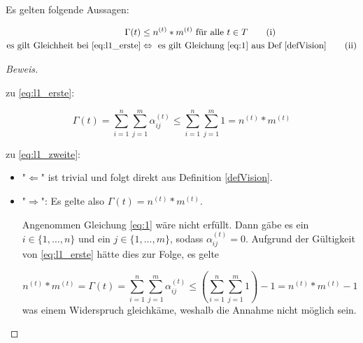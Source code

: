 \vspace{0.3cm}

\begin{Lemma}

Es gelten folgende Aussagen:


\begin{align}
\Gamma(t) &\leq n^{(t)} * m^{(t)} \textrm{ für alle } t \in T \tag{i} \label{eq:l1_erste} \\ 
  \text{es gilt Gleichheit bei }  \eqref{eq:l1_erste} &\Leftrightarrow \text{ es gilt Gleichung } \eqref{eq:1} \text{ aus Def } \ref{defVision} \tag{ii} \label{eq:l1_zweite}
\end{align}



\end{Lemma}

\vspace{0.3cm}

\begin{proof}[Beweis] \textrm{ }

\vspace{0.3cm}

  zu \eqref{eq:l1_erste}: 
  
\begin{equation*}
  \Gamma(t) = \sum_{i=1}^n \sum_{j=1}^m \alpha^{(t)}_{ij} \leq \sum_{i=1}^n \sum_{j=1}^m 1 = n^{(t)} * m^{(t)}
\end{equation*}

\vspace{0.3cm} 

zu \eqref{eq:l1_zweite}: 

\begin{itemize}
  \item "$\Leftarrow$" ist trivial und folgt direkt aus Definition \ref{defVision}.
  \item "$\Rightarrow$": Es gelte also $\Gamma(t) = n^{(t)} * m^{(t)}$.
  
  Angenommen Gleichung \eqref{eq:1} wäre nicht erfüllt. Dann gäbe es ein $i \in \{1,...,n\}$ und ein $j \in \{1,...,m\}$, sodass $\alpha^{(t)}_{ij} = 0$. Aufgrund der Gültigkeit von \eqref{eq:l1_erste} hätte dies zur Folge, es gelte
  
\begin{equation*}
  n^{(t)} * m^{(t)} = \Gamma(t) = \sum_{i=1}^n \sum_{j=1}^m \alpha^{(t)}_{ij} \leq (\sum_{i=1}^n \sum_{j=1}^m 1) - 1 = n^{(t)} * m^{(t)} - 1
\end{equation*}  
was einem Widerspruch gleichkäme, weshalb die Annahme nicht möglich sein.
  
\end{itemize}
  
\end{proof}

